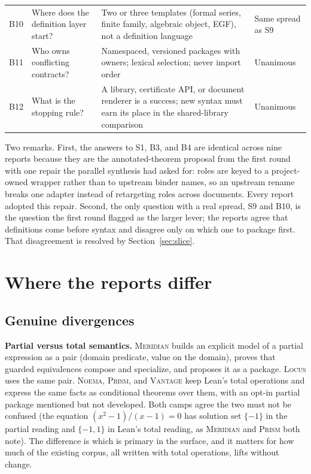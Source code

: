 \documentclass[11pt,a4paper]{article}
\newcommand{\Lc}{\textsc{Locus}}
\newcommand{\Md}{\textsc{Meridian}}
\newcommand{\Nm}{\textsc{Noema}}
\newcommand{\Pm}{\textsc{Prism}}
\newcommand{\Vt}{\textsc{Vantage}}
\theoremstyle{definition}
\begin{document}
\begin{longtable}{@{}L{8mm}L{32mm}L{60mm}L{47mm}@{}}
B10 & Where does the definition layer start? & Two or three templates (formal series, finite family, algebraic object, EGF), not a definition language & Same spread as S9\\
B11 & Who owns conflicting contracts? & Namespaced, versioned packages with owners; lexical selection; never import order & Unanimous\\
B12 & What is the stopping rule? & A library, certificate API, or document renderer is a success; new syntax must earn its place in the shared-library comparison & Unanimous\\
\bottomrule
\end{longtable}
\endgroup

Two remarks. First, the answers to S1, B3, and B4 are identical across nine reports because they are the annotated-theorem proposal from the first round with one repair the parallel synthesis had asked for: roles are keyed to a project-owned wrapper rather than to upstream binder names, so an upstream rename breaks one adapter instead of retargeting roles across documents. Every report adopted this repair. Second, the only question with a real spread, S9 and B10, is the question the first round flagged as the larger lever; the reports agree that definitions come before syntax and disagree only on which one to package first. That disagreement is resolved by Section~\ref{sec:slice}.

\section{Where the reports differ}\label{sec:divergence}

\subsection{Genuine divergences}
\textbf{Partial versus total semantics.} \Md{} builds an explicit model of a partial expression as a pair (domain predicate, value on the domain), proves that guarded equivalences compose and specialize, and proposes it as a package. \Lc{} uses the same pair. \Nm, \Pm, and \Vt{} keep Lean's total operations and express the same facts as conditional theorems over them, with an opt-in partial package mentioned but not developed. Both camps agree the two must not be confused (the equation $(x^2-1)/(x-1)=0$ has solution set $\{-1\}$ in the partial reading and $\{-1,1\}$ in Lean's total reading, as \Md{} and \Pm{} both note). The difference is which is primary in the surface, and it matters for how much of the existing corpus, all written with total operations, lifts without change.
\end{document}
